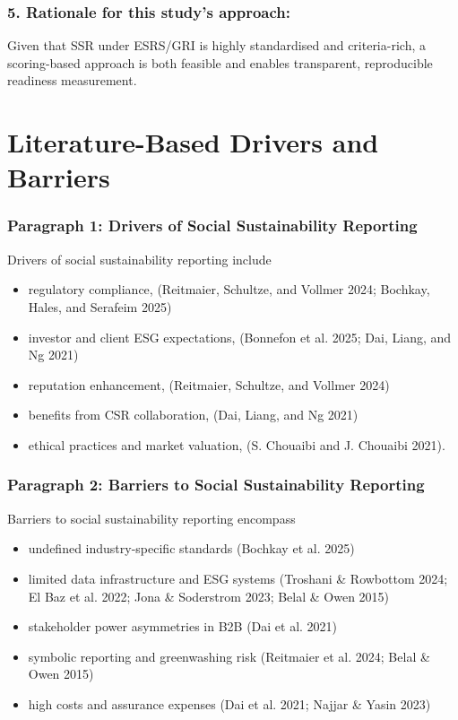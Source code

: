 \subsubsection{5. Rationale for this study's approach:}
Given that SSR under ESRS/GRI is highly standardised and criteria-rich, 
a scoring-based approach is both feasible and enables transparent, reproducible readiness measurement.

\section{Literature-Based Drivers and Barriers}
\subsubsection{Paragraph 1: Drivers of Social Sustainability Reporting}
Drivers of social sustainability reporting include 
\begin{itemize}
    \item regulatory compliance, (Reitmaier, Schultze, and Vollmer 2024; Bochkay,
Hales, and Serafeim 2025)
    \item investor and client ESG expectations, (Bonnefon et al. 2025; Dai, Liang, and Ng 2021)
    \item reputation enhancement, (Reitmaier, Schultze, and Vollmer 2024)
    \item benefits from CSR collaboration, (Dai, Liang, and Ng 2021)
    \item ethical practices and market valuation, (S. Chouaibi and J. Chouaibi 2021).
\end{itemize}

\subsubsection{Paragraph 2: Barriers to Social Sustainability Reporting}
Barriers to social sustainability reporting encompass 
\begin{itemize}
    \item undefined industry-specific standards (Bochkay et al. 2025)
    \item limited data infrastructure and ESG systems (Troshani \& Rowbottom 2024; El Baz et al. 2022; Jona \& Soderstrom 2023; Belal \& Owen 2015)
    \item stakeholder power asymmetries in B2B (Dai et al. 2021)
    \item symbolic reporting and greenwashing risk (Reitmaier et al. 2024; Belal \& Owen 2015)
    \item high costs and assurance expenses (Dai et al. 2021; Najjar \& Yasin 2023)
\end{itemize}